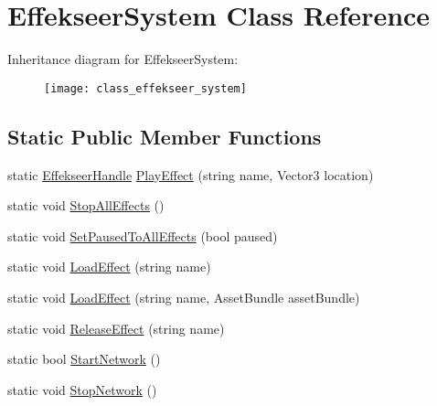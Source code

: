 \hypertarget{class_effekseer_system}{\section{Effekseer\-System Class Reference}
\label{class_effekseer_system}
}
Inheritance diagram for Effekseer\-System\-:\begin{figure}[H]
\begin{center}
\leavevmode
\texttt{[image: class\_effekseer\_system]}
\end{center}
\end{figure}
\subsection*{Static Public Member Functions}
\begin{DoxyCompactItemize}
\item 
static \hyperlink{struct_effekseer_handle}{Effekseer\-Handle} \hyperlink{class_effekseer_system_a8d0a7561a512b64acce39c4456ff6f37}{Play\-Effect} (string name, Vector3 location)
\item 
static void \hyperlink{class_effekseer_system_acf3dde4a65c0e99aeacfea71b517b541}{Stop\-All\-Effects} ()
\item 
static void \hyperlink{class_effekseer_system_af4e9eb30bd4a06ff5bc32b6ef0d020fe}{Set\-Paused\-To\-All\-Effects} (bool paused)
\item 
static void \hyperlink{class_effekseer_system_af4059b796725905982565d8b239bf9fa}{Load\-Effect} (string name)
\item 
static void \hyperlink{class_effekseer_system_a4f7d874f76c4f354b70b852df590be72}{Load\-Effect} (string name, Asset\-Bundle asset\-Bundle)
\item 
static void \hyperlink{class_effekseer_system_a8b328c83692b922217657a21f9d5fdeb}{Release\-Effect} (string name)
\item 
static bool \hyperlink{class_effekseer_system_ad317e23d8505642327cf15c06dcc2e09}{Start\-Network} ()
\item 
static void \hyperlink{class_effekseer_system_ad8dd3bc972839f858dc68a078ff307dc}{Stop\-Network} ()
\end{DoxyCompactItemize}
